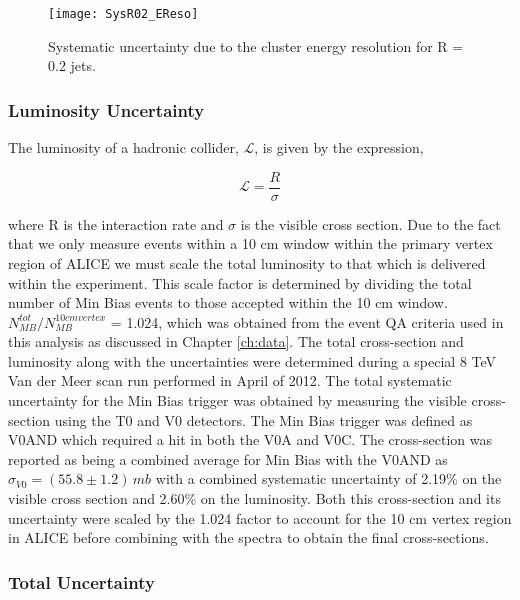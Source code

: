 \begin{figure}[t!]
\texttt{[image: SysR02\_EReso]}
\centering
\caption{Systematic uncertainty due to the cluster energy resolution for R = 0.2 jets.}
\label{fig:Eeff}
\end{figure}


\subsubsection{Luminosity Uncertainty}

The luminosity of a hadronic collider, $\mathscr{L}$, is given by the expression,



\begin{equation}
\mathscr{L} = \frac{R}{\sigma}
\label{eq:xlumdef}
\end{equation}

\noindent
where R is the interaction rate and $\sigma$ is the visible cross section.  Due to the fact that we only measure events within a 10 cm window within the primary vertex region of ALICE we must scale the total luminosity to that which is delivered within the experiment.  This scale factor is determined by dividing the total number of Min Bias events to those accepted within the 10 cm window.  $N^{tot}_{MB} / N^{10 cm vertex}_{MB}$ = 1.024, which was obtained from the event QA criteria used in this analysis as discussed in Chapter \ref{ch:data}.
The total cross-section and luminosity along with the uncertainties were determined during a special 8 TeV Van der Meer scan run performed in April of 2012\cite{ALICE-PUBLIC-2017-002}.  The total systematic uncertainty for the Min Bias trigger was obtained by measuring the visible cross-section using the T0 and V0 detectors.  The Min Bias trigger was defined as V0AND which required a hit in both the V0A and V0C.  The cross-section was reported as being a combined average for Min Bias with the V0AND as $\sigma_{V0} = (55.8 \pm 1.2) \, mb$ with a combined systematic uncertainty of 2.19\% on the visible cross section and 2.60\% on the luminosity.  Both this cross-section and its uncertainty were scaled by the 1.024 factor to account for the 10 cm vertex region in ALICE before combining with the spectra to obtain the final cross-sections.


\subsubsection{Total Uncertainty}

